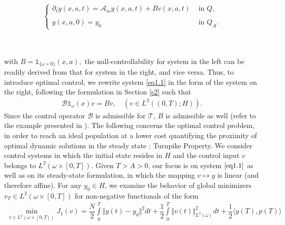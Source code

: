 \documentclass[10pt, a4]{amsart}
\theoremstyle{plain}
\theoremstyle{definition}
\theoremstyle{remark}
\newtheorem{remark}[lemma]{Remark}
\numberwithin{equation}{section}
\begin{document}
\hfill
\begin{minipage}{0.45\linewidth}
\begin{equation*}%
\left\lbrace 
\begin{array}{ll}
\partial_{t}y(x,a,t)=\mathcal{A}_{m}y(x,a,t)+Bv(x,a,t) & \text{ in }  Q,\\
 \\ 
y(x,a,0)=y_0 &\text{ in }  Q_A.
\end{array}
\right.
\end{equation*}
\end{minipage}\\
\\with $B=\mathds{1}_{\lbrace\omega\times0\rbrace}(x,a),$ the null-controllability for system in the left can be readily derived from that for system in the right, and vice versa.  Thus, to introduce optimal control, we rewrite system \eqref{eq1.1} in the form of the system on the right, following the formulation in Section \ref{s2} such that 
\begin{align}
    \mathcal{B}\mathds{1}_{\omega}(x)v=Bv,\quad (v\in L^2((0,T); H)).
\end{align} 
Since the control operator $\mathcal{B}$ is admissible for $\mathcal{T}$, $B$ is admissible as well (refer to the example presented in \cite[Lemma 2.7]{ref79}).
 The following concerns the  optimal control problem, in order to reach an ideal population at a lower cost quantifying the proximity  of  optimal dynamic solutions in the steady state :  Turnpike Property.  
 We consider control systems in which the initial state resides in \( H \) and the control input \( v \) belongs to \( L^2(\omega \times [0, T]) \). Given \( T >A> 0 \), our focus is on system \(\eqref{eq1.1}\) as well as on its steady-state formulation, in which the mapping \( v \mapsto y \)  is linear (and therefore affine).  For any \( y_0 \in H \), we examine the behavior of global minimizers \(v_T \in L^2(\omega \times [0, T])\) for non-negative functionals of the form
\begin{align}\label{eq1.2}
   \min\limits_{v\in L^2(\omega\times[0,T])} J_1(v)=\dfrac{N}{2}\int\limits_{0}^{T}\Vert y(t)-y_d\Vert^2 dt+\dfrac{1}{2}\int\limits_{0}^{T}\Vert v(t)\Vert^2_{L^2(\omega)}dt+\dfrac{1}{2}\langle y(T),p(T)\rangle
\end{align}
\end{document}
